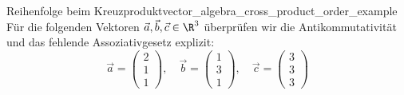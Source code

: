 \begin{ExampleBox}{Reihenfolge beim Kreuzprodukt}{vector_algebra_cross_product_order_example}
  Für die folgenden Vektoren $\vec a,\vec b,\vec c\in\R^3$ überprüfen wir
  die Antikommutativität und das fehlende Assoziativgesetz explizit:
  \[
    \vec a=\begin{pmatrix}2\\1\\1\end{pmatrix},\quad
    \vec b=\begin{pmatrix}1\\3\\1\end{pmatrix},\quad
    \vec c=\begin{pmatrix}3\\3\\3\end{pmatrix}
  \]


\end{ExampleBox}
